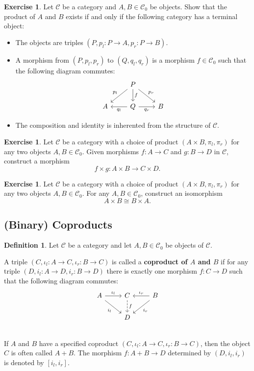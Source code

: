 \documentclass[a4paper,10pt]{scrartcl}
\theoremstyle{plain}
\theoremstyle{definition}
\newtheorem{dfn}[thm]{Definition}
\newtheorem{exer}[thm]{Exercise}
\newcommand{\Cat}[1]{\mathcal{#1}}
\newcommand{\CC}{\Cat{C}}
\newcommand{\Ob}[1]{{#1}_0}
\newcommand{\inl}{\ensuremath{\iota_l}}
\newcommand{\inr}{\ensuremath{\iota_r}}
\newcommand{\projl}{\ensuremath{\pi_l}}
\newcommand{\projr}{\ensuremath{\pi_r}}
\begin{document}
\begin{exer} Let $\CC$ be a category and $A,B\in\Ob{\CC}$ be objects. Show that the product of $A$ and $B$ exists if and only if the following category has a terminal object:
\begin{itemize}
\item The objects are triples $(P,p_l: P\to A, p_r:P\to B)$.
\item A morphism from $(P,p_l,p_r)$ to $(Q,q_l,q_r)$ is a morphism $f\in\Ob{\CC}$ such that the following diagram commutes:
\[
\begin{tikzcd}
& P \arrow[ld,swap, "p_l"] \arrow[rd, "p_r"] \arrow[d, "f"] & \\
A & Q \arrow[l, "q_l"]  \arrow[r,swap, "q_r"] & B
\end{tikzcd}
\]
\item The composition and identity is inherented from the structure of $\CC$.
\end{itemize}
\end{exer}

\begin{exer}
  Let $\CC$ be a category with a choice of product $(A\times B, \projl, \projr)$ for any two objects $A,B\in \Ob{\CC}$.
  Given morphisms $f : A \to C$ and $g : B \to D$ in $\CC$, construct a morphism
  \[ f \times g : A \times B \to C \times D.\]
\end{exer}


\begin{exer}
  Let $\CC$ be a category with a choice of product $(A\times B, \projl, \projr)$ for any two objects $A,B\in \Ob{\CC}$.
  For any $A, B \in \Ob\CC$, construct an isomorphism
  \[ A \times B \cong B \times A. \]
\end{exer}


\subsection{(Binary) Coproducts}
\label{sec:coproducts}



\begin{dfn}
   Let $\CC$ be a category and let $A,B \in \Ob\CC$ be objects of $\CC$.

  A triple $(C,\inl : A \to C,\inr : B \to C)$ is called a \textbf{coproduct of $A$ and $B$} if for any triple $(D,i_l : A \to D, i_r : B \to D)$ there is exactly one morphism $f : C \to D$ such that the following diagram commutes:
  \[
    \begin{tikzcd}
      A \ar[r, "\inl"] \ar[rd, "i_l"']
      &
      C  \ar[d, dashed, "f"]
      &
      B \ar[l, "\inr"'] \ar[ld, "i_r"]
      \\
      &
      D %
      &
      \\
    \end{tikzcd}
  \]
  If $A$ and $B$ have a specified coproduct $(C,\inl : A \to C,\inr : B \to C)$, then the object $C$ is often called $A + B$.
  The morphism $f : A + B \to D$ determined by $(D, i_l, i_r)$ is denoted by $[ i_l, i_r]$.
  
\end{dfn}
\end{document}
